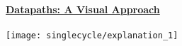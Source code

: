\begin{blocksection}
\textbf{\underline{Datapaths: A Visual Approach}}\\\\
\texttt{[image: singlecycle/explanation\_1]}
\end{blocksection}